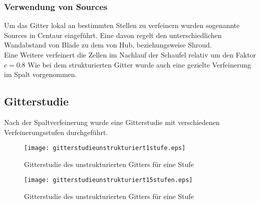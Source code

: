 \subsubsection{Verwendung von Sources}
Um das Gitter lokal an bestimmten Stellen zu verfeinern wurden sogenannte Sources in Centaur eingeführt.
Eine davon regelt den unterschiedlichen Wandabstand von Blade zu dem von Hub, beziehungsweise Shroud.\\
Eine Weitere verfeinert die Zellen im Nachlauf der Schaufel relativ um den Faktor $c = 0.8$
\image
Wie bei dem strukturierten Gitter wurde auch eine gezielte Verfeinerung im Spalt vorgenommen.

\subsection{Gitterstudie}
Nach der Spaltverfeinerung wurde eine Gitterstudie mit verschiedenen Verfeinerungsstufen durchgeführt.
\tabelle
\begin{figure}[htbp]
	\centering
	\texttt{[image: gitterstudieunstrukturiert1stufe.eps]}
	\caption{Gitterstudie des unstrukturierten Gitters für eine Stufe} \label{fig:gitterunstrukturiert1stufe}
\end{figure}

\begin{figure}[htbp]
	\centering
	\texttt{[image: gitterstudieunstrukturiert15stufen.eps]}
	\caption{Gitterstudie des unstrukturierten Gitters für eine Stufe}
	\label{fig:gitterunstrukturiert15stufen}
\end{figure}